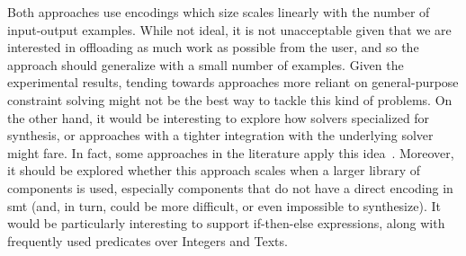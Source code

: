 Both approaches use encodings which size scales linearly with the number of
input-output examples.
While not ideal, it is not unacceptable given that we are interested in
offloading as much work as possible from the user, and so the approach should
generalize with a small number of examples.
Given the experimental results, tending towards approaches more reliant on
general-purpose constraint solving might not be the best way to tackle this kind
of problems.
On the other hand, it would be interesting to explore how solvers specialized
for synthesis, or approaches with a tighter integration with the underlying
solver might fare.
In fact, some approaches in the literature apply this
idea~\cite{Feng:2018:PSU,Abate:2018:CMT}.
Moreover, it should be explored whether this approach scales when a larger
library of components is used, especially components that do not have a direct
encoding in \gls{smt} (and, in turn, could be more difficult, or even impossible
to synthesize).
It would be particularly interesting to support if-then-else expressions, along
with frequently used predicates over Integers and Texts.
